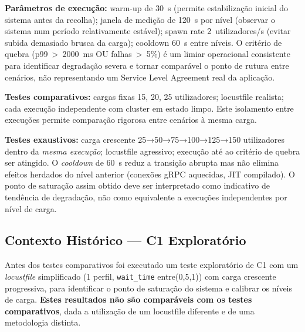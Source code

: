 \documentclass[manuscript,screen,review]{acmart}
\begin{document}
\textbf{Parâmetros de execução:} warm-up de 30~s (permite estabilização inicial do sistema antes da recolha); janela de medição de 120~s por nível (observar o sistema num período relativamente estável); spawn rate 2~utilizadores/s (evitar subida demasiado brusca da carga); cooldown 60~s entre níveis. O critério de quebra (p99~>~2000~ms OU falhas~>~5\%) é um limiar operacional consistente para identificar degradação severa e tornar comparável o ponto de rutura entre cenários, não representando um Service Level Agreement real da aplicação.

\textbf{Testes comparativos:} cargas fixas 15, 20, 25 utilizadores; locustfile realista; cada execução independente com cluster em estado limpo. Este isolamento entre execuções permite comparação rigorosa entre cenários à mesma carga.

\textbf{Testes exaustivos:} carga crescente 25→50→75→100→125→150 utilizadores dentro da \emph{mesma execução}; locustfile agressivo; execução até ao critério de quebra ser atingido. O \textit{cooldown} de 60~s reduz a transição abrupta mas não elimina efeitos herdados do nível anterior (conexões gRPC aquecidas, JIT compilado). O ponto de saturação assim obtido deve ser interpretado como indicativo de tendência de degradação, não como equivalente a execuções independentes por nível de carga.

\subsection{Contexto Histórico — C1 Exploratório}

Antes dos testes comparativos foi executado um teste exploratório de C1 com um \textit{locustfile} simplificado (1 perfil, \texttt{wait\_time} entre(0{,}5,1)) com carga crescente progressiva, para identificar o ponto de saturação do sistema e calibrar os níveis de carga. \textbf{Estes resultados não são comparáveis com os testes comparativos}, dada a utilização de um locustfile diferente e de uma metodologia distinta.
\end{document}
